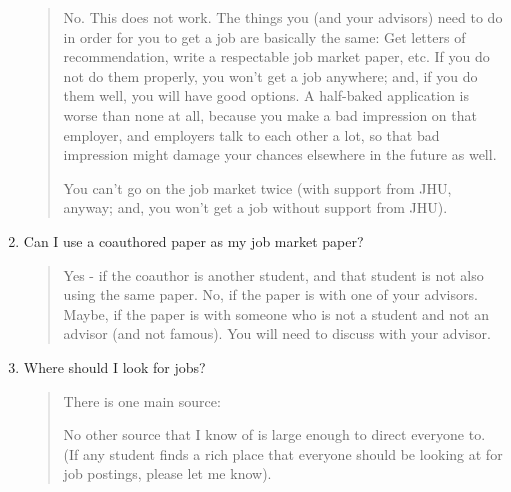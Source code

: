 \documentclass{\classes/econtex}
\begin{document}
\begin{enumerate}
    \begin{quote}
      No.  This does not work.  The things you (and your advisors) need to do in order for you to
      get a job are basically the same: Get letters of recommendation, 
      write a respectable job market paper, etc.  If you do not do them
      properly, you won't get a job anywhere; and, if you do them well,
      you will have good options.  A half-baked application is worse than
      none at all, because you make a bad impression on that employer, and 
      employers talk to each other a lot, so that bad impression might damage
      your chances elsewhere in the future as well.  

      You can't go on the job market twice (with support from JHU, anyway; and, you won't
      get a job without support from JHU).

    \end{quote}
  \item  Can I use a coauthored paper as my job market paper?

    \begin{quote}
    Yes - if the coauthor is another student, and that student is not
    also using the same paper.  No, if the paper is with one of your
    advisors.  Maybe, if the paper is with someone who is not a student
    and not an advisor (and not famous).  You will need to discuss with your advisor.
    \hypertarget{Where-Should-I-Look-for-Jobs}{}

  \end{quote}

\item  Where should I look for jobs? 

  \begin{quote}
    There is one main source: \JOE

      No other source that I know of is large enough to direct everyone to. (If any student finds a rich place that everyone should be looking at for job postings, please let me know).

      \hypertarget{Region-Specific-Job-Markets}{}
      

\end{quote}
\end{enumerate}
\end{document}
